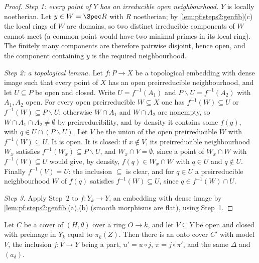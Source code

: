 \begin{proof}
\emph{Step 1: every point of $Y$ has an irreducible open neighbourhood.} $Y$ is locally noetherian.
Let $y\in W=\Spec R$ with $R$ noetherian; by \cref{lem:pf:steps2:genfib}(c) the local rings of $W$
are domains, so two distinct irreducible components of $W$ cannot meet (a common point would have
two minimal primes in its local ring). The finitely many components are therefore pairwise
disjoint, hence open, and the component containing $y$ is the required neighbourhood.

\emph{Step 2: a topological lemma.} Let $f\colon P\to X$ be a topological embedding with dense
image such that every point of $X$ has an open preirreducible neighbourhood, and let $U\subseteq P$
be open and closed. Write $U=f^{-1}(A_1)$ and $P\smallsetminus U=f^{-1}(A_2)$ with $A_1,A_2$ open.
For every open preirreducible $W\subseteq X$ one has $f^{-1}(W)\subseteq U$ or $f^{-1}(W)\subseteq
P\smallsetminus U$: otherwise $W\cap A_1$ and $W\cap A_2$ are nonempty, so $W\cap A_1\cap
A_2\ne\emptyset$ by preirreducibility, and by density it contains some $f(q)$, with $q\in
U\cap(P\smallsetminus U)$. Let $V$ be the union of the open preirreducible $W$ with
$f^{-1}(W)\subseteq U$. It is open. It is closed: if $x\notin V$, its preirreducible neighbourhood
$W_x$ satisfies $f^{-1}(W_x)\subseteq P\smallsetminus U$, and $W_x\cap V=\emptyset$, since a point of
$W_x\cap W$ with $f^{-1}(W)\subseteq U$ would give, by density, $f(q)\in W_x\cap W$ with $q\in U$ and
$q\notin U$. Finally $f^{-1}(V)=U$: the inclusion $\subseteq$ is clear, and for $q\in U$ a
preirreducible neighbourhood $W$ of $f(q)$ satisfies $f^{-1}(W)\subseteq U$, since $q\in
f^{-1}(W)\cap U$.

\emph{Step 3.} Apply Step~2 to $f\colon Y_k\to Y$, an embedding with dense image by
\cref{lem:pf:steps2:genfib}(a),(b) (smooth morphisms are flat), using Step~1.
\end{proof}

\begin{lemma}\label{lem:pf:steps2:covercut}
Let $C$ be a cover of $(H,\theta)$ over a ring $O\to k$, and let $V\subseteq Y$ be open and closed
with preimage in $Y_k$ equal to $\pi_k(Z)$. Then there is an onto cover $C'$ with model $V$, the
inclusion $j\colon V\to Y$ being a part, $u'=u\circ j$, $\pi=j\circ\pi'$, and the same $\Delta$ and
$(a_\delta)$.
\end{lemma}

